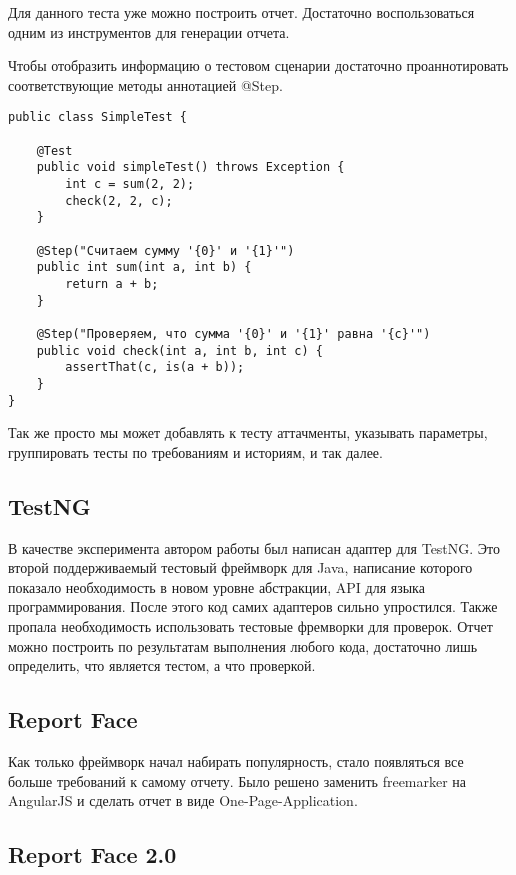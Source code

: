 Для данного теста уже можно построить отчет. Достаточно воспользоваться одним из инструментов для генерации отчета.

Чтобы отобразить информацию о тестовом сценарии достаточно проаннотировать соответствующие методы аннотацией @Step.

\begin{lstlisting}[caption=Простой JUnit тест с добавлением шагов.]
public class SimpleTest {

    @Test
    public void simpleTest() throws Exception {
        int c = sum(2, 2);
        check(2, 2, c);
    }
    
    @Step("Считаем сумму '{0}' и '{1}'")
    public int sum(int a, int b) {
		return a + b;
	}    
    
    @Step("Проверяем, что сумма '{0}' и '{1}' равна '{c}'")
    public void check(int a, int b, int c) {
    	assertThat(c, is(a + b));	
    }
}
\end{lstlisting}

Так же просто мы может добавлять к тесту аттачменты, указывать параметры, группировать тесты по требованиям и историям, и так далее.

\subsection{TestNG}

В качестве эксперимента автором работы был написан адаптер для TestNG. Это второй поддерживаемый тестовый фреймворк для Java, написание которого показало необходимость в новом уровне абстракции, API для языка программирования. После этого код самих адаптеров сильно упростился. Также пропала необходимость использовать тестовые фремворки для проверок. Отчет можно построить по результатам выполнения любого кода, достаточно лишь определить, что является тестом, а что проверкой.

\subsection{Report Face}

Как только фреймворк начал набирать популярность, стало появляться все больше требований к самому отчету. Было решено заменить freemarker на AngularJS и сделать отчет в виде One-Page-Application. 

\subsection{Report Face 2.0}

